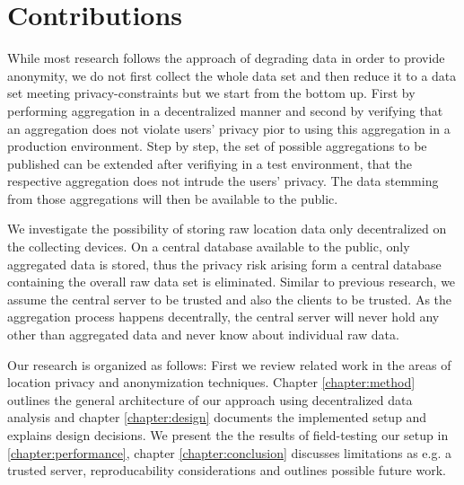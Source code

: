 \section{Contributions}
While most research follows the approach of degrading data in order to provide anonymity, we do not first collect the whole data set and then reduce it to a data set meeting privacy-constraints but we start from the bottom up. First by performing aggregation in a decentralized manner and second by verifying that an aggregation does not violate users' privacy pior to using this aggregation in a production environment. Step by step, the set of possible aggregations to be published can be extended after verifiying in a test environment, that the respective aggregation does not intrude the users' privacy. The data stemming from those aggregations will then be available to the public. 

We investigate the possibility of storing raw location data only decentralized on the collecting devices. On a central database available to the public, only aggregated data is stored, thus the privacy risk arising form a central database containing the overall raw data set is eliminated. Similar to previous research, we assume the central server to be trusted and also the clients to be trusted. As the aggregation process happens decentrally, the central server will never hold any other than aggregated data and never know about individual raw data. 

Our research is organized as follows: First we review related work in the areas of location privacy and anonymization techniques.
Chapter \ref{chapter:method} outlines the general architecture of our approach using decentralized data analysis and chapter \ref{chapter:design} documents the implemented setup and explains design decisions. We present the the results of field-testing our setup in \ref{chapter:performance}, chapter \ref{chapter:conclusion} discusses limitations as e.g. a trusted server, reproducability considerations and outlines possible future work.



